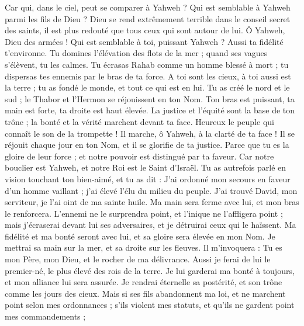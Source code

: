 \begin{multicols}{2}
Car qui, dans le ciel, peut se comparer à Yahweh ? Qui est semblable à Yahweh parmi les fils de Dieu ?
Dieu se rend extrêmement terrible dans le conseil secret des saints, il est plus redouté que tous ceux qui sont autour de lui.
Ô Yahweh, Dieu des armées ! Qui est semblable à toi, puissant Yahweh ? Aussi ta fidélité t'environne.
Tu domines l'élévation des flots de la mer ; quand ses vagues s'élèvent, tu les calmes.
Tu écrasas Rahab comme un homme blessé à mort ; tu dispersas tes ennemis par le bras de ta force.
A toi sont les cieux, à toi aussi est la terre ; tu as fondé le monde, et tout ce qui est en lui.
Tu as créé le nord et le sud ; le Thabor et l'Hermon se réjouissent en ton Nom.
Ton bras est puissant, ta main est forte, ta droite est haut élevée.
La justice et l'équité sont la base de ton trône ; la bonté et la vérité marchent devant ta face.
Heureux le peuple qui connaît le son de la trompette ! Il marche, ô Yahweh, à la clarté de ta face !
Il se réjouit chaque jour en ton Nom, et il se glorifie de ta justice.
Parce que tu es la gloire de leur force ; et notre pouvoir est distingué par ta faveur.
Car notre bouclier est Yahweh, et notre Roi est le Saint d'Israël.
Tu as autrefois parlé en vision touchant ton bien-aimé, et tu as dit : J'ai ordonné mon secours en faveur d'un homme vaillant ; j'ai élevé l'élu du milieu du peuple.
J'ai trouvé David, mon serviteur, je l'ai oint de ma sainte huile.
Ma main sera ferme avec lui, et mon bras le renforcera.
L'ennemi ne le surprendra point, et l'inique ne l'affligera point ;
mais j'écraserai devant lui ses adversaires, et je détruirai ceux qui le haïssent.
Ma fidélité et ma bonté seront avec lui, et sa gloire sera élevée en mon Nom.
Je mettrai sa main sur la mer, et sa droite sur les fleuves.
Il m'invoquera : Tu es mon Père, mon Dieu, et le rocher de ma délivrance.
Aussi je ferai de lui le premier-né, le plus élevé des rois de la terre.
Je lui garderai ma bonté à toujours, et mon alliance lui sera assurée.
Je rendrai éternelle sa postérité, et son trône comme les jours des cieux.
Mais si ses fils abandonnent ma loi, et ne marchent point selon mes ordonnances ;
s'ils violent mes statuts, et qu'ils ne gardent point mes commandements ;

\end{multicols}
